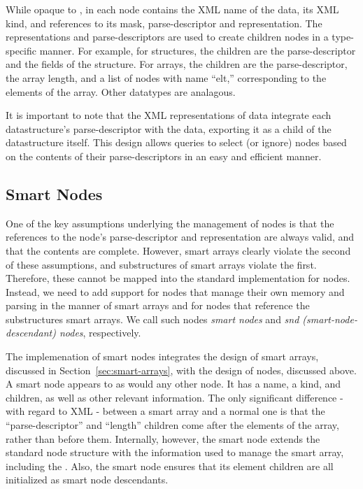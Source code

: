 \documentclass{article}
\begin{document}
While opaque to \galax, in \pads each node contains the XML name of
the data, its XML kind, and references to its mask, parse-descriptor
and representation.  The representations and parse-descriptors are
used to create children nodes in a type-specific manner.  For example,
for structures, the children are the parse-descriptor and the fields
of the structure.  For arrays, the children are the parse-descriptor,
the array length, and a list of nodes with name ``elt,'' corresponding
to the elements of the array. Other datatypes are analagous.

It is important to note that the XML representations of \pads data
integrate each datastructure's parse-descriptor with the data,
exporting it as a child of the datastructure itself. This design
allows queries to select (or ignore) nodes based on the contents of
their parse-descriptors in an easy and efficient manner.


\subsection{Smart Nodes}
\label{subsec:smart-nodes}

One of the key assumptions underlying the management of \pads nodes is
that the references to the node's parse-descriptor and representation
are always valid, and that the contents are complete. However, smart
arrays clearly violate the second of these assumptions, and
substructures of smart arrays violate the first. Therefore, these
cannot be mapped into the standard implementation for nodes. Instead,
we need to add support for nodes that manage their own memory and
parsing in the manner of smart arrays and for nodes that reference the
substructures smart arrays. We call such nodes {\em smart nodes} and
{\em snd (smart-node-descendant) nodes}, respectively.

The implemenation of smart nodes integrates the design of smart
arrays, discussed in Section~\ref{sec:smart-arrays}, with the design
of nodes, discussed above. A smart node appears to \galax as would any
other node. It has a name, a kind, and children, as well as other
relevant information. The only significant difference - with regard to
XML - between a smart
array and a normal one is that the ``parse-descriptor'' and ``length''
children come after the elements of the array, rather than before
them. Internally, however, the smart node extends the standard node
structure with the information used to manage the smart array, including
the \emd. Also, the smart node ensures that its element children are
all initialized as smart node descendants.
\end{document}
